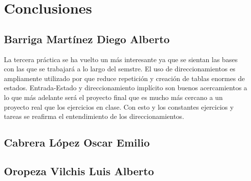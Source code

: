 \documentclass[12pt]{article}
\def\luis{Oropeza Vilchis Luis Alberto}
\def\diego{Barriga Mart\'inez Diego Alberto}
\def\emilio{Cabrera L\'opez Oscar Emilio}
\begin{document}
\section*{Conclusiones}

\subsection*{\diego}
La tercera práctica se ha vuelto un m\'as interesante ya que se sientan las bases con las que se trabajar\'a a lo largo del semstre. El uso de direccionamientos es ampliamente utilizado por que reduce repetici\'on y creaci\'on de tablas enormes de estados. Entrada-Estado y direccionamiento impl\'icito son buenos acercamientos a lo que m\'as adelante ser\'a el proyecto final que es mucho m\'as cercano a un proyecto real que los ejercicios en clase. Con esto y los constantes ejercicios y tareas se reafirma el entendimiento de los direccionamientos.
\subsection*{\emilio}
\subsection*{\luis}
\end{document}
